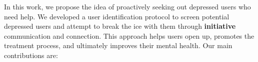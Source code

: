 


In this work, we propose the idea of proactively seeking out depressed users who need help. We developed a user identification protocol to screen potential depressed users and attempt to break the ice with them through \textbf{initiative} communication and connection. This approach helps users open up, promotes the treatment process, and ultimately improves their mental health.
Our main contributions are:

